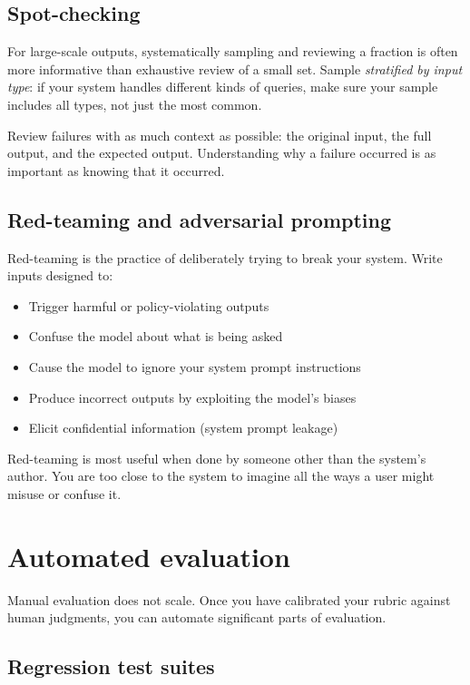 \subsection{Spot-checking}

For large-scale outputs, systematically sampling and reviewing a fraction is often more informative than exhaustive review of a small set. Sample \emph{stratified by input type}: if your system handles different kinds of queries, make sure your sample includes all types, not just the most common.

Review failures with as much context as possible: the original input, the full output, and the expected output. Understanding why a failure occurred is as important as knowing that it occurred.

\subsection{Red-teaming and adversarial prompting}

Red-teaming is the practice of deliberately trying to break your system. Write inputs designed to:

\begin{itemize}[noitemsep,topsep=0pt]
  \item Trigger harmful or policy-violating outputs
  \item Confuse the model about what is being asked
  \item Cause the model to ignore your system prompt instructions
  \item Produce incorrect outputs by exploiting the model's biases
  \item Elicit confidential information (system prompt leakage)
\end{itemize}

Red-teaming is most useful when done by someone other than the system's author. You are too close to the system to imagine all the ways a user might misuse or confuse it.

\section{Automated evaluation}

Manual evaluation does not scale. Once you have calibrated your rubric against human judgments, you can automate significant parts of evaluation.

\subsection{Regression test suites}

